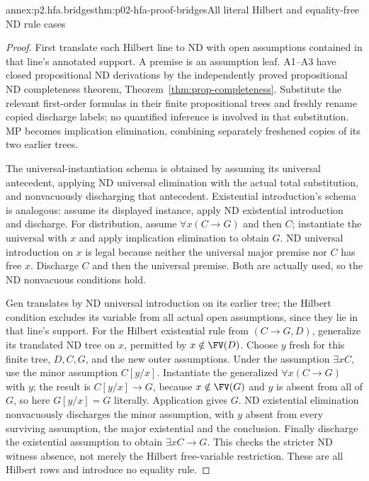 \begin{annexitem}{annex:p2.hfa.bridges}{thm:p02-hfa-proof-bridges}{All literal Hilbert and equality-free ND rule cases}
\begin{proof}
First translate each Hilbert line to ND with open assumptions contained
in that line's annotated support. A premise is an assumption leaf.
A1--A3 have closed propositional ND derivations by the independently
proved propositional ND completeness theorem, Theorem~\ref{thm:prop-completeness}.
Substitute the relevant first-order formulas in their finite propositional
trees and freshly rename copied discharge labels; no quantified inference
is involved in that substitution. MP becomes implication elimination,
combining separately freshened copies of its two earlier trees.

The universal-instantiation schema is obtained by assuming its universal
antecedent, applying ND universal elimination with the actual total
substitution, and nonvacuously discharging that antecedent. Existential
introduction's schema is analogous: assume its displayed instance,
apply ND existential introduction and discharge. For distribution,
assume \(\forall x(C\to G)\) and then \(C\); instantiate the
universal with \(x\) and apply implication elimination to obtain
\(G\). ND universal introduction on \(x\) is legal because
neither the universal major premise nor \(C\) has free \(x\).
Discharge \(C\) and then the universal premise. Both are actually
used, so the ND nonvacuous conditions hold.

Gen translates by ND universal introduction on its earlier tree;
the Hilbert condition excludes its variable from all actual open
assumptions, since they lie in that line's support. For the Hilbert
existential rule from \((C\to G,D)\), generalize its translated
ND tree on \(x\), permitted by \(x\notin\FV(D)\).
Choose \(y\) fresh for this finite tree, \(D,C,G\), and the new
outer assumptions. Under the assumption \(\exists xC\), use
the minor assumption \(C[y/x]\). Instantiate the generalized
\(\forall x(C\to G)\) with \(y\); the result is
\(C[y/x]\to G\), because \(x\notin\FV(G)\) and \(y\)
is absent from all of \(G\), so here \(G[y/x]=G\) literally.
Application gives \(G\). ND existential elimination nonvacuously
discharges the minor assumption, with \(y\) absent from every
surviving assumption, the major existential and the conclusion.
Finally discharge the existential assumption to obtain
\(\exists xC\to G\). This checks the stricter ND witness absence,
not merely the Hilbert free-variable restriction. These are all
Hilbert rows and introduce no equality rule.


\end{proof}
\end{annexitem}
